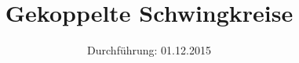 

\subject{Versuchsprotokoll zum Versuch Nr. 355}
\title{Gekoppelte Schwingkreise}
\date{
  Durchführung: 01.12.2015
}



\maketitle
\newpage






\printbibliography


